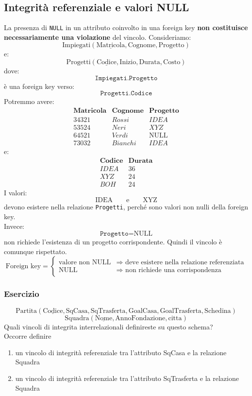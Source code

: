 \subsection{Integrità referenziale e valori NULL}
La presenza di \texttt{NULL} in un attributo coinvolto in una foreign key
\textbf{non costituisce necessariamente una violazione} del vincolo.
Consideriamo:
\[
\text{Impiegati}(
\underline{\text{Matricola}},
\text{Cognome},
\text{Progetto})
\]
e:
\[
\text{Progetti}(
\underline{\text{Codice}},
\text{Inizio},
\text{Durata},
\text{Costo})
\]
dove:
\[
\texttt{Impiegati.Progetto}
\]
è una foreign key verso:
\[
\texttt{Progetti.Codice}
\]
Potremmo avere:
\[
\begin{array}{c|c|c}
\textbf{Matricola} & \textbf{Cognome} & \textbf{Progetto} \\ \hline
34321 & Rossi & IDEA \\
53524 & Neri & XYZ \\
64521 & Verdi & \text{NULL} \\
73032 & Bianchi & IDEA
\end{array}
\]
e:
\[
\begin{array}{c|c}
\textbf{Codice} & \textbf{Durata} \\ \hline
IDEA & 36 \\
XYZ & 24 \\
BOH & 24
\end{array}
\]
I valori:
\[
\text{IDEA}
\qquad\text{e}\qquad
\text{XYZ}
\]
devono esistere nella relazione \texttt{Progetti}, perché sono valori
non nulli della foreign key.\\
Invece:
\[
\texttt{Progetto}=\text{NULL}
\]
non richiede l'esistenza di un progetto corrispondente.
Quindi il vincolo è comunque rispettato.
\[
\boxed{
\text{Foreign key}=
\begin{cases}
\text{valore non NULL}
&\Rightarrow \text{ deve esistere nella relazione referenziata}\\[2mm]
\text{NULL}
&\Rightarrow \text{ non richiede una corrispondenza}
\end{cases}
}
\]


\subsubsection{Esercizio}
\[
\text{Partita}(
\underline{\text{Codice}},
\text{SqCasa},
\text{SqTrasferta},
\text{GoalCasa},
\text{GoalTrasferta},
\text{Schedina})
\]
\[
\text{Squadra}(
\underline{\text{Nome}},
\text{AnnoFondazione},
\text{citta})
\]
Quali vincoli di integrita interrelazionali definireste su questo schema?\\
Occorre definire
\begin{enumerate}
    \item un vincolo di integrità referenziale tra l'attributo SqCasa e la relazione Squadra
    \item un vincolo di integrità referenziale tra l'attributo SqTrasferta e la relazione Squadra
\end{enumerate}

